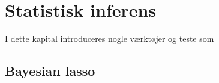 \chapter{Statistisk inferens}
I dette kapital introduceres nogle værktøjer og teste som 

\section{Bayesian lasso}

